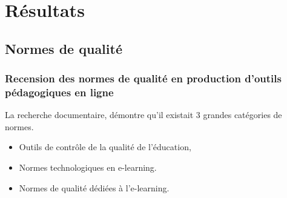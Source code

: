                   \section{Résultats} 
                  \subsection{Normes de qualité} 
					\begin{frame}[allowframebreaks]
						\frametitle{Recension des normes de qualité en production d’outils pédagogiques en ligne}
                        La recherche documentaire, démontre qu’il existait 3 grandes catégories de normes. 
                        			\begin{itemize} 
                       				\item Outils de contrôle de la qualité de l’éducation,
                       				\item Normes technologiques en e-learning. 
                       				\item Normes de qualité dédiées à l’e-learning.
                       		 	\end{itemize}
                       		 \end{frame}                   
